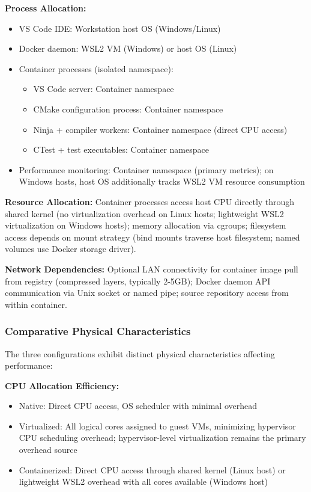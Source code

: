 \textbf{Process Allocation:}
\begin{itemize}
\item VS Code IDE: Workstation host OS (Windows/Linux)
\item Docker daemon: WSL2 VM (Windows) or host OS (Linux)
\item Container processes (isolated namespace):
  \begin{itemize}
  \item VS Code server: Container namespace
  \item CMake configuration process: Container namespace
  \item Ninja + compiler workers: Container namespace (direct CPU access)
  \item CTest + test executables: Container namespace
  \end{itemize}
\item Performance monitoring: Container namespace (primary metrics); on Windows hosts, host OS additionally tracks WSL2 VM resource consumption
\end{itemize}

\textbf{Resource Allocation:} Container processes access host CPU directly through shared kernel (no virtualization overhead on Linux hosts; lightweight WSL2 virtualization on Windows hosts); memory allocation via cgroups; filesystem access depends on mount strategy (bind mounts traverse host filesystem; named volumes use Docker storage driver).

\textbf{Network Dependencies:} Optional LAN connectivity for container image pull from registry (compressed layers, typically 2-5GB); Docker daemon API communication via Unix socket or named pipe; source repository access from within container.

\newpage
\subsubsection{Comparative Physical Characteristics}

The three configurations exhibit distinct physical characteristics affecting performance:

\textbf{CPU Allocation Efficiency:}
\begin{itemize}
\item Native: Direct CPU access, OS scheduler with minimal overhead
\item Virtualized: All logical cores assigned to guest VMs, minimizing hypervisor CPU scheduling overhead; hypervisor-level virtualization remains the primary overhead source
\item Containerized: Direct CPU access through shared kernel (Linux host) or lightweight WSL2 overhead with all cores available (Windows host)
\end{itemize}

